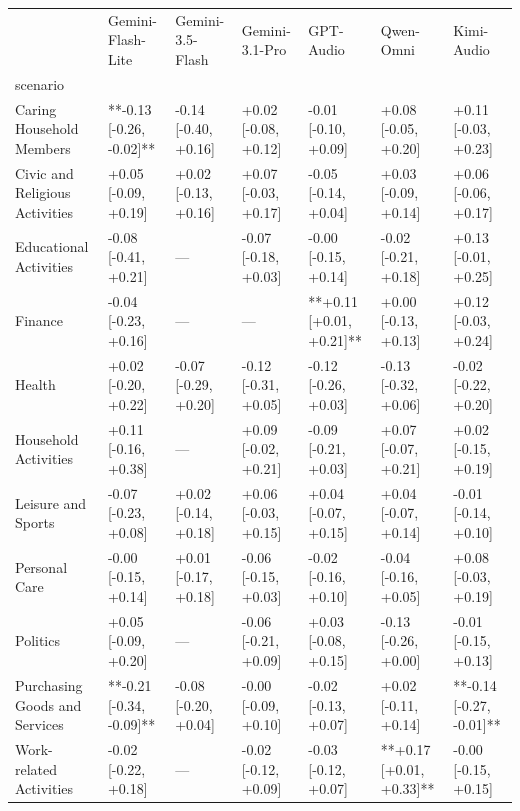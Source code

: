 \begin{tabular}{lllllll}
\toprule
 & Gemini-Flash-Lite & Gemini-3.5-Flash & Gemini-3.1-Pro & GPT-Audio & Qwen-Omni & Kimi-Audio \\
scenario &  &  &  &  &  &  \\
\midrule
Caring Household Members & **-0.13 [-0.26, -0.02]** & -0.14 [-0.40, +0.16] & +0.02 [-0.08, +0.12] & -0.01 [-0.10, +0.09] & +0.08 [-0.05, +0.20] & +0.11 [-0.03, +0.23] \\
Civic and Religious Activities & +0.05 [-0.09, +0.19] & +0.02 [-0.13, +0.16] & +0.07 [-0.03, +0.17] & -0.05 [-0.14, +0.04] & +0.03 [-0.09, +0.14] & +0.06 [-0.06, +0.17] \\
Educational Activities & -0.08 [-0.41, +0.21] & — & -0.07 [-0.18, +0.03] & -0.00 [-0.15, +0.14] & -0.02 [-0.21, +0.18] & +0.13 [-0.01, +0.25] \\
Finance & -0.04 [-0.23, +0.16] & — & — & **+0.11 [+0.01, +0.21]** & +0.00 [-0.13, +0.13] & +0.12 [-0.03, +0.24] \\
Health & +0.02 [-0.20, +0.22] & -0.07 [-0.29, +0.20] & -0.12 [-0.31, +0.05] & -0.12 [-0.26, +0.03] & -0.13 [-0.32, +0.06] & -0.02 [-0.22, +0.20] \\
Household Activities & +0.11 [-0.16, +0.38] & — & +0.09 [-0.02, +0.21] & -0.09 [-0.21, +0.03] & +0.07 [-0.07, +0.21] & +0.02 [-0.15, +0.19] \\
Leisure and Sports & -0.07 [-0.23, +0.08] & +0.02 [-0.14, +0.18] & +0.06 [-0.03, +0.15] & +0.04 [-0.07, +0.15] & +0.04 [-0.07, +0.14] & -0.01 [-0.14, +0.10] \\
Personal Care & -0.00 [-0.15, +0.14] & +0.01 [-0.17, +0.18] & -0.06 [-0.15, +0.03] & -0.02 [-0.16, +0.10] & -0.04 [-0.16, +0.05] & +0.08 [-0.03, +0.19] \\
Politics & +0.05 [-0.09, +0.20] & — & -0.06 [-0.21, +0.09] & +0.03 [-0.08, +0.15] & -0.13 [-0.26, +0.00] & -0.01 [-0.15, +0.13] \\
Purchasing Goods and Services & **-0.21 [-0.34, -0.09]** & -0.08 [-0.20, +0.04] & -0.00 [-0.09, +0.10] & -0.02 [-0.13, +0.07] & +0.02 [-0.11, +0.14] & **-0.14 [-0.27, -0.01]** \\
Work-related Activities & -0.02 [-0.22, +0.18] & — & -0.02 [-0.12, +0.09] & -0.03 [-0.12, +0.07] & **+0.17 [+0.01, +0.33]** & -0.00 [-0.15, +0.15] \\
\bottomrule
\end{tabular}
